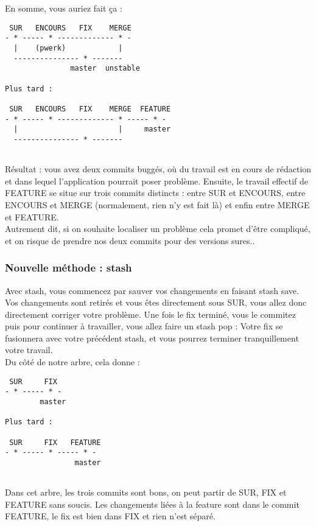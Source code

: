 En somme, vous auriez fait ça :\\
\begin{verbatim} 
 SUR   ENCOURS   FIX    MERGE
- * ----- * ------------- * -
  |    (pwerk)            |
  --------------- * -------
               master  unstable
               
Plus tard :

 SUR   ENCOURS   FIX    MERGE  FEATURE
- * ----- * ------------- * ----- * -
  |                       |     master
  --------------- * -------
                 
\end{verbatim}

Résultat : vous avez deux commits buggés, où du travail est en cours de rédaction et dans lequel l'application pourrait poser problème. Ensuite, le travail effectif de FEATURE se situe sur trois commits distincts : entre SUR et ENCOURS, entre ENCOURS et MERGE (normalement, rien n'y est fait là) et enfin entre MERGE et FEATURE.\\

Autrement dit, si on souhaite localiser un problème cela promet d'être compliqué, et on risque de prendre nos deux commits pour des versions sures..
\newpage
\subsubsection{Nouvelle méthode : stash}

Avec stash, vous commencez par sauver vos changements en faisant stash save.\\
Vos changements sont retirés et vous êtes directement sous SUR, vous allez donc directement corriger votre problème. Une fois le fix terminé, vous le commitez puis pour continuer à travailler, vous allez faire un stash pop : Votre fix se fusionnera avec votre précédent stash, et vous pourrez terminer tranquillement votre travail.\\

Du côté de notre arbre, cela donne :
\begin{verbatim}
 SUR     FIX
- * ----- * -
        master
        
Plus tard :

 SUR     FIX   FEATURE
- * ----- * ----- * -      
                master
      
\end{verbatim}   

Dans cet arbre, les trois commits sont bons, on peut partir de SUR, FIX et FEATURE sans soucis. Les changements liées à la feature sont dans le commit FEATURE, le fix est bien dans FIX et rien n'est séparé.\\

